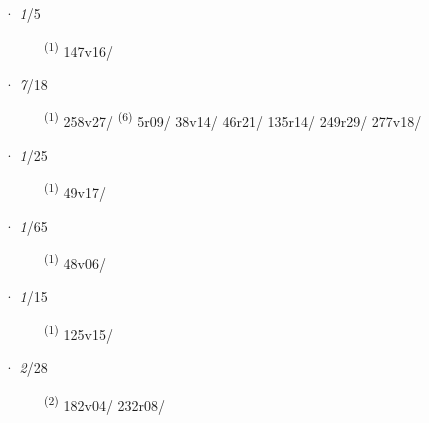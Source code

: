 \noindent{} · \textit{1}/5 \LEMMALINE
\begin{description}
    \item[]  \textsuperscript{(1)} \mbox{147v16/}
\end{description}
\ENTRYEND
\noindent{} · \textit{7}/18 \LEMMALINE
\begin{description}
    \item[]  \textsuperscript{(1)} \mbox{258v27/} \CASEBREAK {} \textsuperscript{(6)} \mbox{5r09/} \mbox{38v14/} \mbox{46r21/} \mbox{135r14/} \mbox{249r29/} \mbox{277v18/}
\end{description}
\ENTRYEND
\noindent{} · \textit{1}/25 \LEMMALINE
\begin{description}
    \item[]  \textsuperscript{(1)} \mbox{49v17/}
\end{description}
\ENTRYEND
\noindent{} · \textit{1}/65 \LEMMALINE
\begin{description}
    \item[]  \textsuperscript{(1)} \mbox{48v06/}
\end{description}
\ENTRYEND
\noindent{} · \textit{1}/15 \LEMMALINE
\begin{description}
    \item[]  \textsuperscript{(1)} \mbox{125v15/}
\end{description}
\ENTRYEND
\noindent{} · \textit{2}/28 \LEMMALINE
\begin{description}
    \item[]  \textsuperscript{(2)} \mbox{182v04/} \mbox{232r08/}
\end{description}
